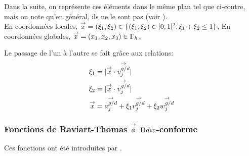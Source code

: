     \begin{minipage}{0.45\textwidth}
      \begin{center}
        \begin{tikzpicture}[scale=1]
          
        \end{tikzpicture}
      \end{center}
      \label{fig:form_int:fon_base:tri}
    \end{minipage}
    \begin{minipage}{0.54\textwidth}
      Dans la suite, on représente ces éléments dans le même plan tel que ci-contre, mais on note qu'en général, ils ne le sont pas (voir \cite[fig.~2]{rao_electromagnetic_1982}).\\

      En coordonnées locales, \(\vx = (\xi_1,\xi_2) \in \lbrace (\xi_1,\xi_2) \in [0,1]^2, \xi_1 + \xi_2 \le 1\rbrace\),
      En coordonnées globales, \(\vx = (x_1,x_2,x_3) \in \Gamma_h\),

      Le passage de l'un à l'autre se fait grâce aux relations:
      \begin{align}
        \xi_1 &= |\vx \cdot \vect{v_j^{g/d}}| \\
        \xi_2 &= |\vx \cdot \vect{v_j^{g/d}}| \\
        \vx &= \vect{a_j^{g/d}}+ \xi_1 \vect{v_j^{g/d}} + \xi_2 \vect{w_j^{g/d}}
      \end{align}
    \end{minipage}

    \subsubsection[Fonctions de Raviart-Thomas phi Hdiv-conforme]{Fonctions de Raviart-Thomas \(\vect{\phi}\) \(\Hdiv\)-conforme}

      Ces fonctions ont été introduites par \cite{raviart_mixed_1977,rao_electromagnetic_1982}.

